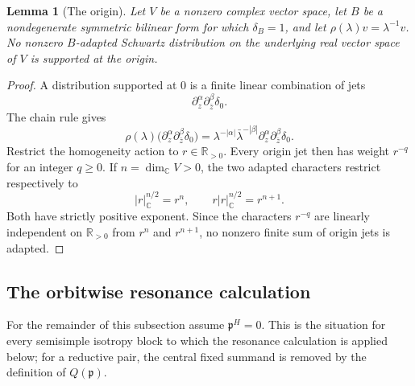 \documentclass[10pt,a4paper]{amsart}
\numberwithin{equation}{section}
\newtheorem{lemma}[theorem]{Lemma}
\newcommand{\C}{\mathbb C}
\newcommand{\R}{\mathbb R}
\newcommand{\fp}{\mathfrak p}
\begin{document}
\begin{lemma}[The origin]
\label{core:lem:origin-adapted}
Let $V$ be a nonzero complex vector space, let $B$ be a nondegenerate
symmetric bilinear form for which $\delta_B=1$, and let
$\rho(\lambda)v=\lambda^{-1}v$.  No nonzero $B$-adapted Schwartz
distribution on the underlying real vector space of $V$ is supported at the
origin.
\end{lemma}

\begin{proof}
A distribution supported at $0$ is a finite linear combination of jets
\[
  \partial_z^\alpha\partial_{\bar z}^\beta\delta_0.
\]
The chain rule gives
\[
 \rho(\lambda)
 \bigl(\partial_z^\alpha\partial_{\bar z}^\beta\delta_0\bigr)
 =\lambda^{-|\alpha|}\bar\lambda^{-|\beta|}
 \partial_z^\alpha\partial_{\bar z}^\beta\delta_0.
\]
Restrict the homogeneity action to $r\in\R_{>0}$.  Every origin jet then has
weight $r^{-q}$ for an integer $q\geq0$.  If $n=\dim_\C V>0$, the two adapted
characters restrict respectively to
\[
  |r|_\C^{n/2}=r^n,
  \qquad
  r|r|_\C^{n/2}=r^{n+1}.
\]
Both have strictly positive exponent.  Since the characters $r^{-q}$ are
linearly independent on $\R_{>0}$ from $r^n$ and $r^{n+1}$, no nonzero finite
sum of origin jets is adapted.
\end{proof}

\subsection{The orbitwise resonance calculation}

For the remainder of this subsection assume $\fp^H=0$.  This is the situation
for every semisimple isotropy block to which the resonance calculation is
applied below; for a reductive pair, the central fixed summand is removed by
the definition of $Q(\fp)$.
\end{document}
